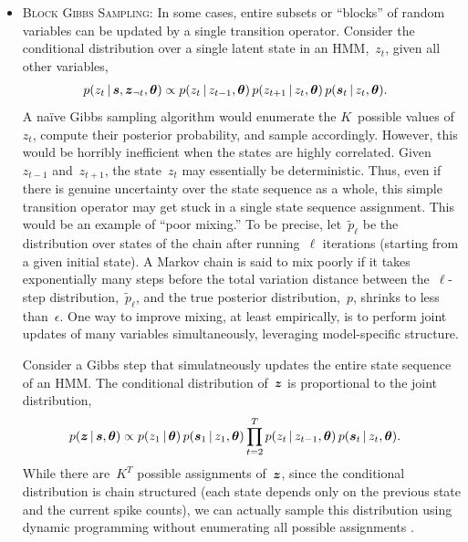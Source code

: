 \begin{itemize}
\item \textsc{Block Gibbs Sampling}:
  In some cases, entire subsets or ``blocks'' of random variables can 
  be updated by a single transition operator. Consider the conditional
  distribution over a single latent state in an HMM,~$z_t$, given all other
  variables,  
  \begin{align*}
    p(z_t \,|\, \boldsymbol{s}, \boldsymbol{z}_{\neg t}, \boldsymbol{\theta}) 
    &\propto p(z_t \,|\, z_{t-1}, \boldsymbol{\theta}) \,
    p(z_{t+1} \,|\, z_t, \boldsymbol{\theta}) \,
    p(\boldsymbol{s}_t \,|\, z_t, \boldsymbol{\theta}).
  \end{align*}
  A na\"ive Gibbs sampling algorithm would enumerate the $K$~possible
  values of~$z_t$, compute their posterior probability, and sample
  accordingly. However, this would be horribly inefficient when the
  states are highly correlated. Given~$z_{t-1}$ and~$z_{t+1}$, the
  state~$z_t$ may essentially be deterministic. Thus, even if there is
  genuine uncertainty over the state sequence as a whole, this simple
  transition operator may get stuck in a single state sequence
  assignment.  This would be an example of ``poor mixing.'' To be
  precise, let~$\widetilde{p}_\ell$ be the distribution over states of
  the chain after running~$\ell$ iterations (starting from a given
  initial state).  A Markov chain is said to mix poorly if it takes
  exponentially many steps before the total variation distance between
  the~$\ell$-step distribution,~$\widetilde{p}_\ell$, and the true
  posterior distribution,~$p$, shrinks to less than~$\epsilon$.  
  One way to improve mixing, at least empirically, is
  to perform joint updates of many variables simultaneously,
  leveraging model-specific structure.

  Consider a Gibbs step that simulatneously updates the entire
  state sequence of an HMM.  The conditional distribution of~$\boldsymbol{z}$ is
  proportional to the joint distribution,
  \begin{align*}
    p(\boldsymbol{z} \,|\, \boldsymbol{s}, \boldsymbol{\theta}) 
    &\propto p(z_1 \,|\, \boldsymbol{\theta}) \, p(\boldsymbol{s}_1 \,|\, z_1, \boldsymbol{\theta})
      \prod_{t=2}^T p(z_t \,|\, z_{t-1}, \boldsymbol{\theta}) \, 
      p(\boldsymbol{s}_t \,|\, z_t, \boldsymbol{\theta}).
  \end{align*}
  While there are~$K^T$ possible assignments of~$\boldsymbol{z}$, since the
  conditional distribution is chain structured (each state depends
  only on the previous state and the current spike counts), we can
  actually sample this distribution using dynamic programming
  without enumerating all possible assignments \citep[e.g.][]{bishop2006pattern}.
  

\end{itemize}
